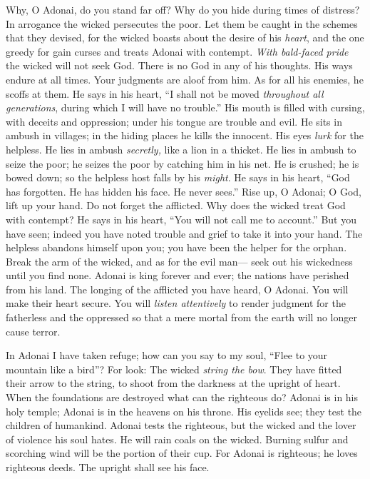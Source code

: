 \begin{biblechapter} %
 Why, O Adonai, do you stand far off? 
Why do you hide during times of distress?
\verse In arrogance the wicked persecutes the poor. 
Let them be caught in the schemes that they devised,
\verse for the wicked boasts about the desire of his \textit{heart}, 
and the one greedy for gain curses and treats Adonai with contempt.
\verse \textit{With bald-faced pride} the wicked will not seek God. 
There is no God in any of his thoughts.
\verse His ways endure at all times. 
Your judgments are aloof from him. 
As for all his enemies, he scoffs at them.
\verse He says in his heart, “I shall not be moved 
\textit{throughout all generations}, during which I will have no trouble.”
\verse His mouth is filled with cursing, 
with deceits and oppression; 
under his tongue are trouble and evil.
\verse He sits in ambush in villages; 
in the hiding places he kills the innocent. 
His eyes \textit{lurk} for the helpless.
\verse He lies in ambush \textit{secretly,} like a lion in a thicket. 
He lies in ambush to seize the poor; 
he seizes the poor by catching him in his net.
\verse He is crushed; he is bowed down; 
so the helpless host falls by his \textit{might}.
\verse He says in his heart, “God has forgotten. 
He has hidden his face. 
He never sees.”
\verse Rise up, O Adonai; 
O God, lift up your hand. 
Do not forget the afflicted.
\verse Why does the wicked treat God with contempt? 
He says in his heart, “You will not call me to account.”
\verse But you have seen; indeed you have noted trouble and grief 
to take it into your hand. 
The helpless abandons himself upon you; 
you have been the helper for the orphan.
\verse Break the arm of the wicked, 
and as for the evil man— 
seek out his wickedness until you find none.
\verse Adonai is king forever and ever; 
the nations have perished from his land.
\verse The longing of the afflicted you have heard, O Adonai. 
You will make their heart secure. You will \textit{listen attentively}
\verse to render judgment for the fatherless and the oppressed 
so that a mere mortal from the earth will no longer cause terror.
\end{biblechapter}

\begin{biblechapter} %
 In Adonai I have taken refuge; 
how can you say to my soul, 
“Flee to your mountain like a bird”?
\verse For look: The wicked \textit{string the bow}. 
They have fitted their arrow to the string, 
to shoot from the darkness 
at the upright of heart.
\verse When the foundations are destroyed 
what can the righteous do?
\verse Adonai is in his holy temple; 
Adonai is in the heavens on his throne. 
His eyelids see; 
they test the children of humankind.
\verse Adonai tests the righteous, 
but the wicked and the lover of violence 
his soul hates.
\verse He will rain coals on the wicked. 
Burning sulfur and scorching wind 
will be the portion of their cup.
\verse For Adonai is righteous; 
he loves righteous deeds. 
The upright shall see his face.
\end{biblechapter}

